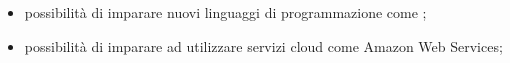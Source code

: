 \begin{itemize}
\item possibilità di imparare nuovi linguaggi di programmazione come ;
\item possibilità di imparare ad utilizzare servizi cloud come Amazon Web Services;
\end{itemize}